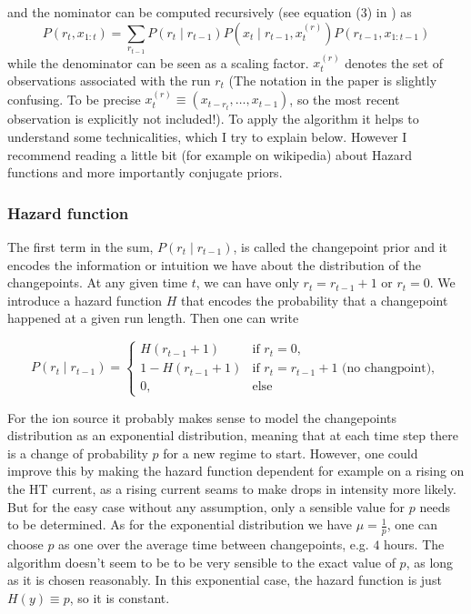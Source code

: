 \documentclass[12pt,a4paper]{article}
\begin{document}
and the nominator can be computed recursively (see equation (3) in \cite{Adams:BayesianOnlineChangepoint}) as
\begin{equation}\label{eq:prob_rt_and_x1t}
	P(r_t, x_{1:t}) = \sum_{r_{t-1}} P(r_t \mid r_{t-1}) P(x_t \mid r_{t-1}, x_t^{(r)}) P(r_{t-1}, x_{1:t-1})
\end{equation}
while the denominator can be seen as a scaling factor. $x_t^{(r)}$ denotes the set of observations associated with the run $r_t$ (The notation in the paper is slightly confusing. To be precise $x_t^{(r)} \equiv (x_{t-r_t}, \dots, x_{t-1})$, so the most recent observation is explicitly not included!). To apply the algorithm it helps to understand some technicalities, which I try to explain below. However I recommend reading a little bit (for example on wikipedia) about Hazard functions and more importantly conjugate priors.

\subsubsection{Hazard function}
The first term in the sum, $P(r_t \mid r_{t-1})$,  is called the changepoint prior and it encodes the information or intuition we have about the distribution of the changepoints. At any given time $t$, we can have only $r_t=r_{t-1} + 1$ or $r_t=0$. We introduce a hazard function $H$ that encodes the probability that a changepoint happened at a given run length. Then one can write

\begin{equation*}
	P(r_t \mid r_{t-1}) = \begin{cases}
		H(r_{t-1} + 1) &\text{if } r_t=0, \\
		1 - H(r_{t-1} + 1) &\text{if } r_t=r_{t-1} + 1 \text{ (no changpoint)},  \\
		0, & \text{else} 
	\end{cases}
\end{equation*}

For the ion source it probably makes sense to model the changepoints distribution as an exponential distribution, meaning that at each time step there is a change of probability $p$ for a new regime to start. However, one could improve this by making the hazard function dependent for example on a rising on the HT current, as a rising current seams to make drops in intensity more likely. But for the easy case without any assumption, only a sensible value for $p$ needs to be determined. As for the exponential distribution we have $\mu=\frac1p$, one can choose $p$ as one over the average time between changepoints, e.g. $4$ hours. The algorithm doesn't seem to be to be very sensible to the exact value of $p$, as long as it is chosen reasonably. In this exponential case, the hazard function is just $H(y)\equiv p$, so it is constant.
\end{document}
